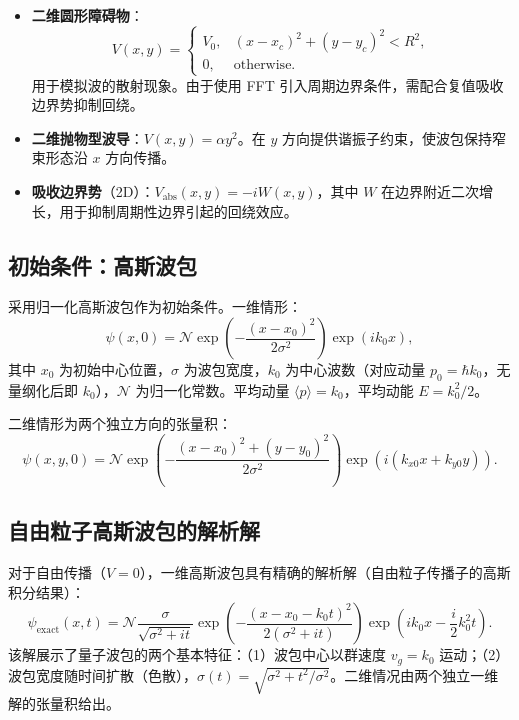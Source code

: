 \documentclass[12pt,a4paper]{article}
\begin{document}
\begin{itemize}
    \item \textbf{二维圆形障碍物}：
    \begin{equation}
        V(x,y) =
        \begin{cases}
            V_0, & (x-x_c)^2 + (y-y_c)^2 < R^2, \\
            0,   & \text{otherwise}.
        \end{cases}
    \end{equation}
    用于模拟波的散射现象。由于使用 FFT 引入周期边界条件，需配合复值吸收边界势抑制回绕。

    \item \textbf{二维抛物型波导}：$V(x,y) = \alpha y^2$。在 $y$ 方向提供谐振子约束，使波包保持窄束形态沿 $x$ 方向传播。

    \item \textbf{吸收边界势}（2D）：$V_{\text{abs}}(x,y) = -iW(x,y)$，其中 $W$ 在边界附近二次增长，用于抑制周期性边界引起的回绕效应。
\end{itemize}

\subsection{初始条件：高斯波包}

采用归一化高斯波包作为初始条件。一维情形：
\begin{equation}\label{eq:gaussian1d}
    \psi(x,0) = \mathcal{N} \exp\left(-\frac{(x-x_0)^2}{2\sigma^2}\right) \exp(i k_0 x),
\end{equation}
其中 $x_0$ 为初始中心位置，$\sigma$ 为波包宽度，$k_0$ 为中心波数（对应动量 $p_0 = \hbar k_0$，无量纲化后即 $k_0$），$\mathcal{N}$ 为归一化常数。平均动量 $\langle p \rangle = k_0$，平均动能 $E = k_0^2/2$。

二维情形为两个独立方向的张量积：
\begin{equation}\label{eq:gaussian2d}
    \psi(x,y,0) = \mathcal{N} \exp\left(-\frac{(x-x_0)^2+(y-y_0)^2}{2\sigma^2}\right)
    \exp(i(k_{x0}x + k_{y0}y)).
\end{equation}

\subsection{自由粒子高斯波包的解析解}

对于自由传播（$V=0$），一维高斯波包具有精确的解析解（自由粒子传播子的高斯积分结果）：
\begin{equation}\label{eq:exact1d}
    \psi_{\text{exact}}(x,t) = \mathcal{N}\frac{\sigma}{\sqrt{\sigma^2 + it}}
    \exp\left(-\frac{(x - x_0 - k_0 t)^2}{2(\sigma^2 + it)}\right)
    \exp\left(i k_0 x - \frac{i}{2}k_0^2 t\right).
\end{equation}
该解展示了量子波包的两个基本特征：（1）波包中心以群速度 $v_g = k_0$ 运动；（2）波包宽度随时间扩散（色散），$\sigma(t) = \sqrt{\sigma^2 + t^2/\sigma^2}$。二维情况由两个独立一维解的张量积给出。
\end{document}
